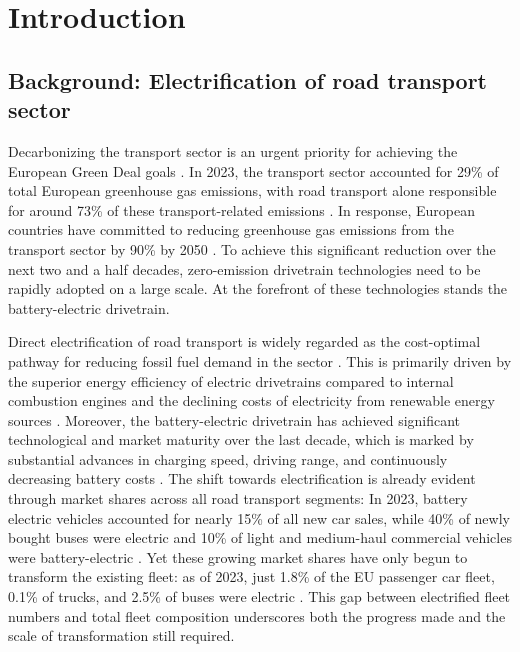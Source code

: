 \chapter{Introduction}\label{sec:Introduction}
\section{Background: Electrification of road transport sector}

Decarbonizing the transport sector is an urgent priority for achieving the European Green Deal goals \cite{EuropeanCommission2019GreenDeal}. In 2023, the transport sector accounted for 29\% of total European greenhouse gas emissions, with road transport alone responsible for around 73\% of these transport-related emissions \cite{EEA2025GHGTransport}. In response, European countries have committed to reducing greenhouse gas emissions from the transport sector by 90\% by 2050 \cite{eu_mobility_strategy}. To achieve this significant reduction over the next two and a half decades, zero-emission drivetrain technologies need to be rapidly adopted on a large scale. At the forefront of these technologies stands the battery-electric drivetrain.

Direct electrification of road transport is widely regarded as the cost-optimal pathway for reducing fossil fuel demand in the sector \cite{VANDERZWAAN2013562}. This is primarily driven by the superior energy efficiency of electric drivetrains compared to internal combustion engines and the declining costs of electricity from renewable energy sources \cite{Edelenbosch2017DecomposingTransport}. Moreover, the battery-electric drivetrain has achieved significant technological and market maturity over the last decade, which is marked by substantial advances in charging speed, driving range, and continuously decreasing battery costs \cite{IEA2025GlobalEVOutlook}. The shift towards electrification is already evident through market shares across all road transport segments: In 2023, battery electric vehicles accounted for nearly 15\% of all new car sales, while 40\% of newly bought buses were electric and 10\% of light and medium-haul commercial vehicles were battery-electric \cite{ICCT2024EUVehicleStats}. Yet these growing market shares have only begun to transform the existing fleet: as of 2023, just 1.8\% of the EU passenger car fleet, 0.1\% of trucks, and 2.5\% of buses were electric \cite{ACEA2025VehiclesEuropeanRoads}. This gap between electrified fleet numbers and total fleet composition underscores both the progress made and the scale of transformation still required.

